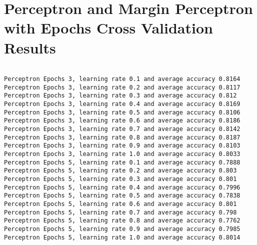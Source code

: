 \section{Perceptron and Margin Perceptron with Epochs Cross Validation Results}
\begin{Verbatim}[fontsize=\small]

Perceptron Epochs 3, learning rate 0.1 and average accuracy 0.8164
Perceptron Epochs 3, learning rate 0.2 and average accuracy 0.8117
Perceptron Epochs 3, learning rate 0.3 and average accuracy 0.812
Perceptron Epochs 3, learning rate 0.4 and average accuracy 0.8169
Perceptron Epochs 3, learning rate 0.5 and average accuracy 0.8106
Perceptron Epochs 3, learning rate 0.6 and average accuracy 0.8186
Perceptron Epochs 3, learning rate 0.7 and average accuracy 0.8142
Perceptron Epochs 3, learning rate 0.8 and average accuracy 0.8187
Perceptron Epochs 3, learning rate 0.9 and average accuracy 0.8103
Perceptron Epochs 3, learning rate 1.0 and average accuracy 0.8033
Perceptron Epochs 5, learning rate 0.1 and average accuracy 0.7888
Perceptron Epochs 5, learning rate 0.2 and average accuracy 0.803
Perceptron Epochs 5, learning rate 0.3 and average accuracy 0.801
Perceptron Epochs 5, learning rate 0.4 and average accuracy 0.7996
Perceptron Epochs 5, learning rate 0.5 and average accuracy 0.7838
Perceptron Epochs 5, learning rate 0.6 and average accuracy 0.801
Perceptron Epochs 5, learning rate 0.7 and average accuracy 0.798
Perceptron Epochs 5, learning rate 0.8 and average accuracy 0.7762
Perceptron Epochs 5, learning rate 0.9 and average accuracy 0.7985
Perceptron Epochs 5, learning rate 1.0 and average accuracy 0.8014


\end{Verbatim}
